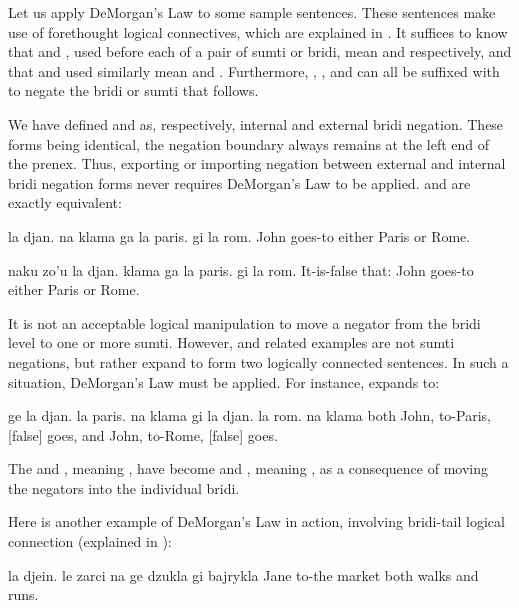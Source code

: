 Let us apply DeMorgan's Law to some sample sentences. These
    sentences make use of forethought logical connectives, which
    are explained in . It
    suffices to know that  and , used before each of a
    pair of sumti or bridi, mean  and 
    respectively, and that  and  used similarly mean
     and . Furthermore, , , and 
    can all be suffixed with  to negate the bridi or sumti
    that follows.

We have defined  and  as, respectively,
    internal and external bridi negation. These forms being
    identical, the negation boundary always remains at the left end
    of the prenex. Thus, exporting or importing negation between
    external and internal bridi negation forms never requires
    DeMorgan's Law to be applied. 
    and  are exactly
    equivalent:
\begin{example}
la djan. na klama ga la paris. gi la rom.\n
John  goes-to either Paris or Rome.
\end{example}

\begin{example}
naku zo'u la djan. klama ga la paris. gi la rom.\n
It-is-false that: John goes-to either Paris or Rome.
\end{example}

It is not an acceptable logical manipulation to move a negator
    from the bridi level to one or more sumti. However,  and related examples are not
    sumti negations, but rather expand to form two logically
    connected sentences. In such a situation, DeMorgan's Law must
    be applied. For instance, 
    expands to:
\begin{example}
ge la djan. la paris. na klama\n
\T	gi la djan. la rom. na klama\n
{} both John, to-Paris, [false] goes,\n
\T	and John, to-Rome, [false] goes.
\end{example}

The  and , meaning , have become
     and , meaning , as a consequence of
    moving the negators into the individual bridi.

Here is another example of DeMorgan's Law in action,
    involving bridi-tail logical connection (explained in ):
\begin{example}
la djein. le zarci na ge dzukla gi bajrykla\n
Jane to-the market  both walks and runs.
\end{example}

